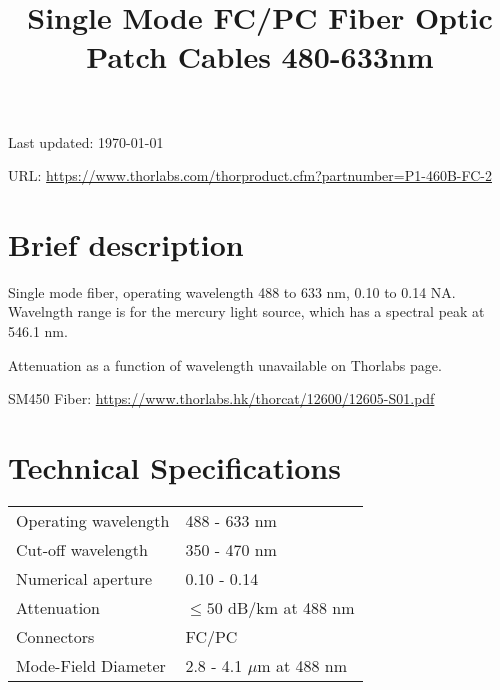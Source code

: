 \documentclass{article}
\title{\vspace{-4cm}Single Mode FC/PC Fiber Optic Patch Cables 480-633nm}
\date{}
\begin{document}
\maketitle

\vspace{-1cm}

Last updated: \today

URL: \url{https://www.thorlabs.com/thorproduct.cfm?partnumber=P1-460B-FC-2}


\begin{multicols}{2}

\section{Brief description}

Single mode fiber, operating wavelength 488 to 633 nm, 0.10 to 0.14 NA.  Wavelngth range is for the mercury light source, which has a spectral peak at 546.1 nm.

Attenuation as a function of wavelength unavailable on Thorlabs page.

SM450 Fiber: \url{https://www.thorlabs.hk/thorcat/12600/12605-S01.pdf}




\section{Technical Specifications}

\begin{tabular}{|l|l|}
Operating wavelength & 488 - 633 nm \\
Cut-off wavelength & 350 - 470 nm \\
Numerical aperture & 0.10 - 0.14\\
Attenuation & $\leq 50$ dB/km at 488 nm \\
Connectors & FC/PC\\
Mode-Field Diameter & 2.8 - 4.1 $\mu$m at 488 nm\\



\end{tabular}
\end{multicols}
\end{document}

